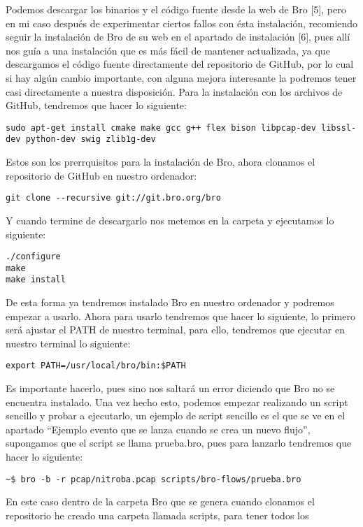 {{{Podemos descargar los binarios y el código fuente desde la web de Bro [5], 
pero en mi caso después de experimentar ciertos fallos con ésta instalación, 
recomiendo seguir la instalación de Bro de su web en el apartado de instalación [6], 
pues allí nos guía a una instalación que es más fácil de mantener actualizada, 
ya que descargamos el código fuente directamente del repositorio de GitHub, 
por lo cual si hay algún cambio importante, con alguna mejora interesante 
la podremos tener casi directamente a nuestra disposición.
\intro
Para la instalación con los archivos de GitHub, tendremos que hacer lo siguiente:
\intro
\begin{lstlisting}[language=Consola]
sudo apt-get install cmake make gcc g++ flex bison libpcap-dev libssl-dev python-dev swig zlib1g-dev
\end{lstlisting}
\intro
Estos son los prerrquisitos para la instalación de Bro, ahora clonamos el 
repositorio de GitHub en nuestro ordenador:
\intro
\begin{lstlisting}[language=Consola]
git clone --recursive git://git.bro.org/bro
\end{lstlisting}
\intro
Y cuando termine de descargarlo nos metemos en la carpeta y ejecutamos lo siguiente:
\intro
\begin{lstlisting}[language=Consola]
./configure
make
make install
\end{lstlisting}
\intro
De esta forma ya tendremos instalado Bro en nuestro ordenador y podremos empezar 
a usarlo.
\intro
Ahora para usarlo tendremos que hacer lo siguiente, lo primero será ajustar el 
PATH de nuestro terminal, para ello, tendremos que ejecutar en nuestro terminal 
lo siguiente:
\intro
\begin{lstlisting}[language=Consola]
export PATH=/usr/local/bro/bin:$PATH
\end{lstlisting}
\intro
Es importante hacerlo, pues sino nos saltará un error diciendo que Bro no se 
encuentra instalado. Una vez hecho esto, podemos empezar realizando un script 
sencillo y probar a ejecutarlo, un ejemplo de script sencillo es el que se ve 
en el apartado “Ejemplo evento que se lanza cuando se crea un nuevo flujo”, 
supongamos que el script se llama prueba.bro, pues para lanzarlo tendremos 
que hacer lo siguiente:
\intro
\begin{lstlisting}[language=Consola]
~$ bro -b -r pcap/nitroba.pcap scripts/bro-flows/prueba.bro
\end{lstlisting}
\intro
En este caso dentro de la carpeta Bro que se genera cuando clonamos el 
repositorio he creado una carpeta llamada scripts, para tener todos los 
}}}
